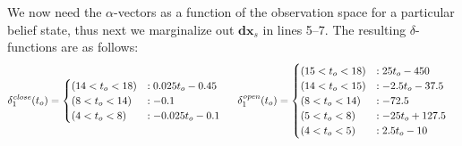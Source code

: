 \documentclass{article} %
\newcommand{\xds}{\mathbf{dx}_s}
\newcommand{\open}{\mathit{open}}
\newcommand{\close}{\mathit{close}}
\begin{document}
We now need the $\alpha$-vectors as a function of the observation
space for a particular belief state, thus next we marginalize out $\xds$
in lines 5--7. The resulting $\delta$-functions are as follows:
{\footnotesize
\vspace{-1mm}
\begin{align}
\delta^{\close}_1(t_o) &= 
\begin{cases}
 (14 < t_o< 18) &: 0.025 t_o - 0.45\\
 (8 < t_o< 14) &:  - 0.1\\
 (4 < t_o< 8) &: - 0.025 t_o -0.1\\
\end{cases}
\hspace{5mm} 
\delta^{\open}_1(t_o) = \begin{cases}
 (15 < t_o< 18) &: 25 t_o - 450\\
 (14 < t_o< 15) &: - 2.5 t_o - 37.5\\
 (8 < t_o< 14) &:  -72.5\\
 (5 < t_o< 8) &: - 25 t_o + 127.5\\
 (4 < t_o< 5) &:  2.5 t_o - 10\\
\end{cases}
\nonumber
\end{align}
\vspace{-4mm}
}
\end{document}

